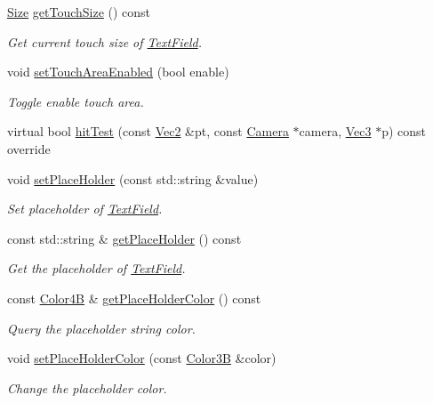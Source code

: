 \begin{DoxyCompactItemize}
\hyperlink{classSize}{Size} \hyperlink{classui_1_1TextField_a4aee73c65ff1fcf04d2049ff9ac5c050}{get\+Touch\+Size} () const
\begin{DoxyCompactList}\small\item\em Get current touch size of \hyperlink{classui_1_1TextField}{Text\+Field}. \end{DoxyCompactList}\item 
void \hyperlink{classui_1_1TextField_a3321c112af10e67485ca44ab44a1ae0c}{set\+Touch\+Area\+Enabled} (bool enable)
\begin{DoxyCompactList}\small\item\em Toggle enable touch area. \end{DoxyCompactList}\item 
virtual bool \hyperlink{classui_1_1TextField_ac45348cef120c7acdd13e95f72831d2c}{hit\+Test} (const \hyperlink{classVec2}{Vec2} \&pt, const \hyperlink{classCamera}{Camera} $\ast$camera, \hyperlink{classVec3}{Vec3} $\ast$p) const override
\item 
void \hyperlink{classui_1_1TextField_a6b31c82b05591b783f1a0f6e1cbc5802}{set\+Place\+Holder} (const std\+::string \&value)
\begin{DoxyCompactList}\small\item\em Set placeholder of \hyperlink{classui_1_1TextField}{Text\+Field}. \end{DoxyCompactList}\item 
const std\+::string \& \hyperlink{classui_1_1TextField_a96fbe0d0a7e870d072af2f6acda48e63}{get\+Place\+Holder} () const
\begin{DoxyCompactList}\small\item\em Get the placeholder of \hyperlink{classui_1_1TextField}{Text\+Field}. \end{DoxyCompactList}\item 
const \hyperlink{structColor4B}{Color4B} \& \hyperlink{classui_1_1TextField_a123ff2ed7516eb4f6374f4c27734ede9}{get\+Place\+Holder\+Color} () const
\begin{DoxyCompactList}\small\item\em Query the placeholder string color. \end{DoxyCompactList}\item 
void \hyperlink{classui_1_1TextField_a64bf3054d1aa45eeea0dd3b01b953c50}{set\+Place\+Holder\+Color} (const \hyperlink{structColor3B}{Color3B} \&color)
\begin{DoxyCompactList}\small\item\em Change the placeholder color. \end{DoxyCompactList}\item 

\end{DoxyCompactItemize}
